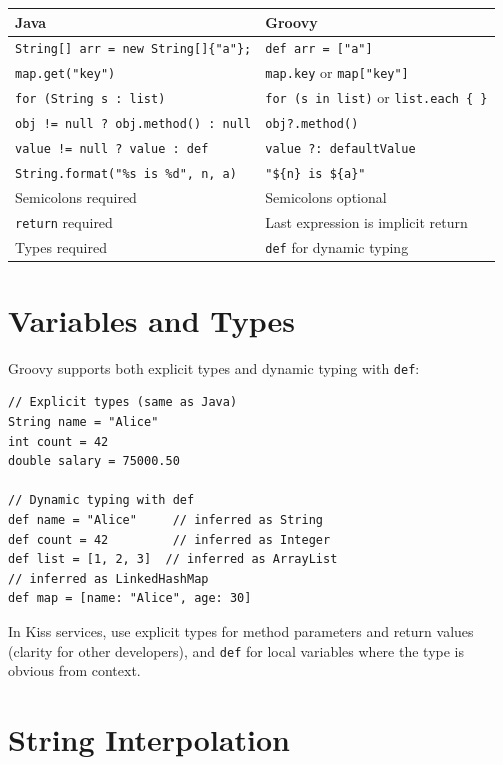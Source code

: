 \begin{longtable}{P{4.2cm}P{6.3cm}}
\toprule
\textbf{Java} & \textbf{Groovy} \\
\midrule
\endhead
\texttt{String[] arr = new String[]\{"a"\};} & \texttt{def arr = ["a"]} \\
\texttt{map.get("key")} & \texttt{map.key} or \texttt{map["key"]} \\
\texttt{for (String s : list)} & \texttt{for (s in list)} or \texttt{list.each \{ \}} \\
\texttt{obj != null ? obj.method() : null} & \texttt{obj?.method()} \\
\texttt{value != null ? value : def} & \texttt{value ?: defaultValue} \\
\texttt{String.format("\%s is \%d", n, a)} & \texttt{"\$\{n\} is \$\{a\}"} \\
Semicolons required & Semicolons optional \\
\texttt{return} required & Last expression is implicit return \\
Types required & \texttt{def} for dynamic typing \\
\bottomrule
\end{longtable}

\section{Variables and Types}
\label{sec:groovy-types}

Groovy supports both explicit types and dynamic typing with \texttt{def}:

\begin{lstlisting}[style=groovy]
// Explicit types (same as Java)
String name = "Alice"
int count = 42
double salary = 75000.50

// Dynamic typing with def
def name = "Alice"     // inferred as String
def count = 42         // inferred as Integer
def list = [1, 2, 3]  // inferred as ArrayList
// inferred as LinkedHashMap
def map = [name: "Alice", age: 30]
\end{lstlisting}

\begin{tipbox}
In Kiss services, use explicit types for method parameters and return values (clarity for other developers), and \texttt{def} for local variables where the type is obvious from context.
\end{tipbox}

\section{String Interpolation}
\label{sec:groovy-strings}

